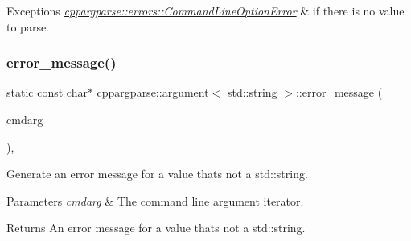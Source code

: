 \begin{DoxyExceptions}{Exceptions}
{\em \hyperlink{classcppargparse_1_1errors_1_1CommandLineOptionError}{cppargparse\+::errors\+::\+Command\+Line\+Option\+Error}} & if there is no value to parse. \\
\hline
\end{DoxyExceptions}
\mbox{\label{structcppargparse_1_1argument_3_01std_1_1string_01_4_ae5172423c61ac176e9c8b018c0ad91c0}} 
\subsubsection{\texorpdfstring{error\+\_\+message()}{error\_message()}}
{\footnotesize\ttfamily static const char$\ast$ \hyperlink{structcppargparse_1_1argument}{cppargparse\+::argument}$<$ std\+::string $>$\+::error\+\_\+message (\begin{DoxyParamCaption}\item[{const types\+::\+Command\+Line\+Argument\+\_\+t \&}]{cmdarg }\end{DoxyParamCaption})\hspace{0.3cm}{\ttfamily [inline]}, {\ttfamily [static]}}



Generate an error message for a value that\textquotesingle{}s not a std\+::string. 


\begin{DoxyParams}{Parameters}
{\em cmdarg} & The command line argument iterator.\\
\hline
\end{DoxyParams}
\begin{DoxyReturn}{Returns}
An error message for a value that\textquotesingle{}s not a std\+::string. 
\end{DoxyReturn}
\mbox{\label{structcppargparse_1_1argument_3_01std_1_1string_01_4_a59f51e61ddf11929299211600a36180c}} 
